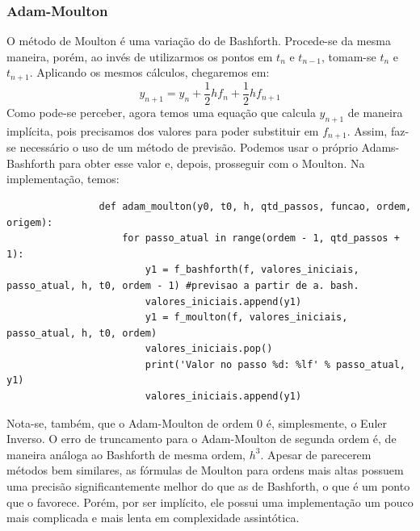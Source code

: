 \documentclass{article}
\begin{document}
\begin{otherlanguage}{brazil}
        \subsubsection{Adam-Moulton}
            O método de Moulton é uma variação do de Bashforth. Procede-se da mesma maneira, porém, ao invés de utilizarmos os pontos em $t_n$ e $t_{n-1}$, tomam-se $t_n$ e $t_{n+1}$. Aplicando os mesmos cálculos, chegaremos em:
            \begin{equation}
                y_{n+1} = y_n + \frac{1}{2}hf_n + \frac{1}{2}hf_{n+1}
            \end{equation}
            Como pode-se perceber, agora temos uma equação que calcula $y_{n+1}$ de maneira implícita, pois precisamos dos valores para poder substituir em $f_{n+1}$. Assim, faz-se necessário o uso de um método de previsão. Podemos usar o próprio Adams-Bashforth para obter esse valor e, depois, prosseguir com o Moulton. Na implementação, temos:
            \begin{lstlisting}
                def adam_moulton(y0, t0, h, qtd_passos, funcao, ordem, origem):
                    for passo_atual in range(ordem - 1, qtd_passos + 1):
                        y1 = f_bashforth(f, valores_iniciais, passo_atual, h, t0, ordem - 1) #previsao a partir de a. bash.
                        valores_iniciais.append(y1)
                        y1 = f_moulton(f, valores_iniciais, passo_atual, h, t0, ordem)
                        valores_iniciais.pop()
                        print('Valor no passo %d: %lf' % passo_atual, y1)
                        valores_iniciais.append(y1)
            \end{lstlisting}
            Nota-se, também, que o Adam-Moulton de ordem 0 é, simplesmente, o Euler Inverso. O erro de truncamento para o Adam-Moulton de segunda ordem é, de maneira análoga ao Bashforth de mesma ordem, $h^3$.
            Apesar de parecerem métodos bem similares, as fórmulas de Moulton para ordens mais altas possuem uma precisão significantemente melhor do que as de Bashforth, o que é um ponto que o favorece. Porém, por ser implícito, ele possui uma implementação um pouco mais complicada e mais lenta em complexidade assintótica.

\end{otherlanguage}
\end{document}
